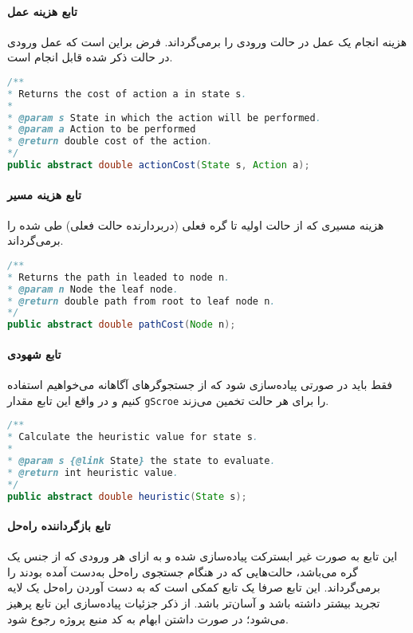 	\paragraph{تابع هزینه عمل}
	هزینه انجام یک عمل در حالت ورودی را برمی‌گرداند. فرض براین است که عمل ورودی در حالت ذکر شده قابل انجام است.
	\begin{latin}
		\begin{lstlisting}[language=Java]
/**
* Returns the cost of action a in state s.
*
* @param s State in which the action will be performed.
* @param a Action to be performed
* @return double cost of the action.
*/
public abstract double actionCost(State s, Action a);
\end{lstlisting}
	\end{latin}

	\paragraph{تابع هزینه مسیر}
	هزینه مسیری که از حالت اولیه تا گره فعلی (دربردارنده حالت فعلی) طی شده را برمی‌گرداند.
		\begin{latin}
		\begin{lstlisting}[language=Java]
/**
* Returns the path in leaded to node n.
* @param n Node the leaf node.
* @return double path from root to leaf node n.
*/
public abstract double pathCost(Node n);
\end{lstlisting}
	\end{latin}

	\paragraph{تابع شهودی}
	فقط باید در صورتی پیاده‌سازی شود که از جستجوگرهای آگاهانه می‌خواهیم استفاده کنیم و در واقع این تابع مقدار
	\texttt{gScroe}
	را برای هر حالت تخمین می‌زند.
	\begin{latin}
		\begin{lstlisting}[language=Java]
/**
* Calculate the heuristic value for state s.
*
* @param s {@link State} the state to evaluate.
* @return int heuristic value.
*/
public abstract double heuristic(State s);
\end{lstlisting}
	\end{latin}

	\paragraph{تابع بازگرداننده راه‌حل}
	این تابع به صورت غیر ابسترکت پیاده‌سازی شده و به ازای هر ورودی که از جنس یک گره می‌باشد، حالت‌هایی که در هنگام جستجوی راه‌حل به‌دست آمده بودند را برمی‌گرداند. این تابع صرفا یک تابع کمکی است که به دست آوردن راه‌حل یک لایه تجرید بیشتر داشته باشد و آسان‌تر باشد. از ذکر جزئیات پیاده‌سازی این تابع پرهیز می‌شود؛ در صورت داشتن ابهام به کد منبع پروژه رجوع شود.
	
